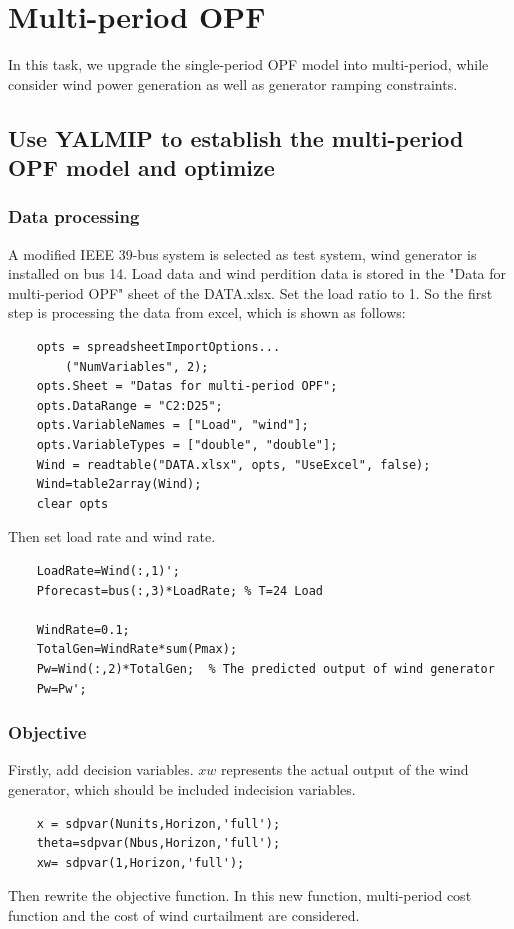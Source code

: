 \documentclass[lettersize,journal]{IEEEtran}
\begin{document}
\section{Multi-period OPF}
In this task, we upgrade the single-period OPF model into multi-period, while consider wind power generation as well as generator ramping constraints.
\subsection{Use YALMIP to establish the multi-period OPF model and optimize}
\subsubsection{Data processing}
A modified IEEE 39-bus system is selected as test system, wind generator is installed on bus 14. Load data and wind perdition data is stored in the "Data for multi-period OPF" sheet of the DATA.xlsx. Set the load ratio to 1. So the first step is processing the data from excel, which is shown as follows:
\begin{lstlisting}
	opts = spreadsheetImportOptions...
		("NumVariables", 2);
	opts.Sheet = "Datas for multi-period OPF";
	opts.DataRange = "C2:D25";
	opts.VariableNames = ["Load", "wind"];
	opts.VariableTypes = ["double", "double"];
	Wind = readtable("DATA.xlsx", opts, "UseExcel", false);
	Wind=table2array(Wind);
	clear opts
\end{lstlisting}

Then set load rate and wind rate.
\begin{lstlisting}
	LoadRate=Wind(:,1)';
	Pforecast=bus(:,3)*LoadRate; % T=24 Load
	
	WindRate=0.1;
	TotalGen=WindRate*sum(Pmax);
	Pw=Wind(:,2)*TotalGen;  % The predicted output of wind generator
	Pw=Pw';
\end{lstlisting}

\subsubsection{Objective}
Firstly, add decision variables. $xw$ represents the actual output of the wind generator, which should be included indecision variables.
\begin{lstlisting}
	x = sdpvar(Nunits,Horizon,'full');
	theta=sdpvar(Nbus,Horizon,'full');
	xw= sdpvar(1,Horizon,'full');
\end{lstlisting}

Then rewrite the objective function. In this new function, multi-period cost function and the cost of wind curtailment are considered.
\end{document}
